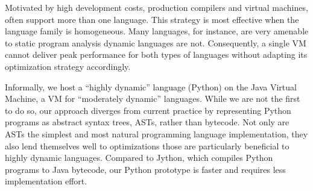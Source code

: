 \thesisabstract
{

Motivated by high development costs, production compilers and virtual machines, often support more than one language.
This strategy is most effective when the language family is homogeneous.
Many languages, for instance, are very amenable to static program analysis dynamic languages are not.
Consequently, a single VM cannot deliver peak performance for both types of languages without adapting its optimization strategy accordingly.

Informally, we host a ``highly dynamic'' language (Python) on the Java Virtual Machine, a VM for ``moderately dynamic'' languages.
While we are not the first to do so, our approach diverges from current practice by representing Python programs as abstract syntax trees, ASTs, rather than bytecode.
Not only are ASTs the simplest and most natural programming language implementation,
they also lend themselves well to optimizations those are particularly beneficial to highly dynamic languages.
Compared to Jython, which compiles Python programs to Java bytecode, our Python prototype is faster and requires less implementation effort.

}


